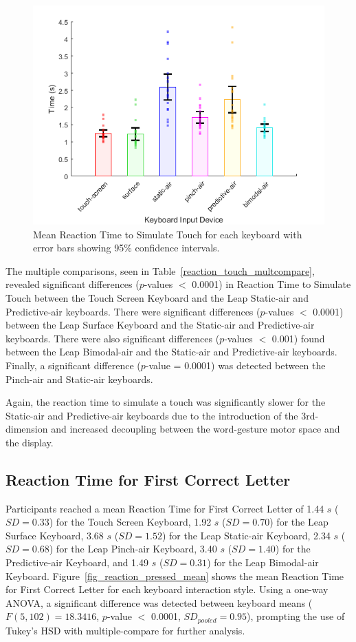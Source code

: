 \begin{figure}[!t]
	\centering
	\includegraphics{Figures/fig_reaction_touch_mean}
	\caption[Mean Reaction Time to Simulate Touch]{Mean Reaction Time to Simulate Touch for each keyboard with error bars showing 95\% confidence intervals.}
	\label{fig_reaction_touch_mean}
\end{figure}

The multiple comparisons, seen in Table~\ref{reaction_touch_multcompare}, revealed significant differences ($p$-values $<$ 0.0001) in Reaction Time to Simulate Touch between the Touch Screen Keyboard and the Leap Static-air and Predictive-air keyboards. There were significant differences ($p$-values $<$ 0.0001) between the Leap Surface Keyboard and the Static-air and Predictive-air keyboards. There were also significant differences ($p$-values $<$ 0.001) found between the Leap Bimodal-air and the Static-air and Predictive-air keyboards. Finally, a significant difference ($p$-value = 0.0001) was detected between the Pinch-air and Static-air keyboards.

Again, the reaction time to simulate a touch was significantly slower for the Static-air and Predictive-air keyboards due to the introduction of the 3rd-dimension and increased decoupling between the word-gesture motor space and the display.

\subsection{Reaction Time for First Correct Letter}
Participants reached a mean Reaction Time for First Correct Letter of 1.44 $s$ ($SD = 0.33$) for the Touch Screen Keyboard, 1.92 $s$ ($SD = 0.70$) for the Leap Surface Keyboard, 3.68 $s$ ($SD = 1.52$) for the Leap Static-air Keyboard, 2.34 $s$ ($SD = 0.68$) for the Leap Pinch-air Keyboard, 3.40 $s$ ($SD = 1.40$) for the Predictive-air Keyboard, and 1.49 $s$ ($SD = 0.31$) for the Leap Bimodal-air Keyboard. Figure~\ref{fig_reaction_pressed_mean} shows the mean Reaction Time for First Correct Letter for each keyboard interaction style. Using a one-way ANOVA, a significant difference was detected between keyboard means ($F(5, 102) = 18.3416$, $p$-value $<$ 0.0001, $SD_{pooled} = 0.95$), prompting the use of Tukey's HSD with multiple-compare for further analysis.

